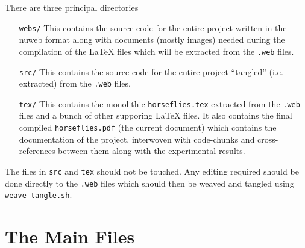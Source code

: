 \documentclass[11.5pt]{report}
\begin{document}
There are three principal directories 
\begin{itemize}

 \item[\texttt{webs/}] This contains the source code for the entire project written in 
                       the nuweb format along with documents (mostly images)
                       needed during the compilation of the \LaTeX{} files which will 
                       be extracted from the \texttt{.web} files. 

 \item[\texttt{src/}] This contains the source code for the entire project ``tangled'' 
                      (i.e. extracted) from the \texttt{.web} files. 
 \item[\texttt{tex/}] This contains the monolithic \texttt{horseflies.tex} extracted 
                      from the \texttt{.web} files and a bunch 
                      of other supporing \LaTeX{} files. It also contains the final 
                      compiled \texttt{horseflies.pdf} (the current document) which 
                      contains the documentation of the project, interwoven with 
                      code-chunks and cross-references between them along with the 
                      experimental results.  
\end{itemize}  

The files in \texttt{src} and \texttt{tex} should not be touched. Any editing required should 
be done directly to the \texttt{.web} files which should then be weaved and tangled 
using \texttt{weave-tangle.sh}. 

\section{The Main Files} 
\end{document}
